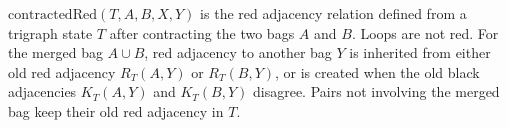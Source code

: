 \(\mathrm{contractedRed}(T,A,B,X,Y)\) is the red adjacency relation
defined from a trigraph state \(T\) after contracting the two bags \(A\) and
\(B\).  Loops are not red.  For the merged bag \(A\cup B\), red adjacency to
another bag \(Y\) is inherited from either old red adjacency
\(R_T(A,Y)\) or \(R_T(B,Y)\), or is created when the old black adjacencies
\(K_T(A,Y)\) and \(K_T(B,Y)\) disagree.  Pairs not involving the merged bag
keep their old red adjacency in \(T\).
